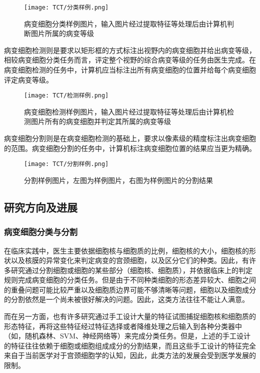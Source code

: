\begin{figure}[h]
    \centering
    \texttt{[image: TCT/分类样例.png]}
    \caption{病变细胞分类样例图片，输入图片经过提取特征等处理后由计算机判断图片所属的病变等级}
    \label{分类样例}
\end{figure}
\par 病变细胞检测则是要求以矩形框的方式标注出视野内的病变细胞并给出病变等级，相较病变细胞分类任务而言，评定整个视野的综合病变等级的任务由医生完成。在病变细胞检测的任务中，计算机应当标注出所有病变细胞的位置并给每个病变细胞评定病变等级。

\begin{figure}[h]
    \centering
    \texttt{[image: TCT/检测样例.png]}
    \caption{病变细胞检测样例图片，输入图片经过提取特征等处理后由计算机检测图片所有的病变细胞并判定其所属的病变等级}
    \label{检测样例}
\end{figure}
\par 病变细胞分割则是在病变细胞检测的基础上，要求以像素级的精度标注出病变细胞的范围。病变细胞分割的任务中，计算机标注病变细胞位置的结果应当更为精确。

\begin{figure}[h]
    \centering
    \texttt{[image: TCT/分割样例.png]}
    \caption{分割样例图片，左图为样例图片，右图为样例图片的分割结果}
    \label{分割样例}
\end{figure}

\subsection{研究方向及进展}

\subsubsection{病变细胞分类与分割}
\par 在临床实践中，医生主要依据细胞核与细胞质的比例，细胞核的大小，细胞核的形状以及核膜的异常变化来判定病变的宫颈细胞，以及区分它们的种类。因此，有许多研究\cite{zhang2014segmentation}\cite{zhang2017graph}\cite{lee2016segmentation}通过分割细胞或细胞的某些部分（细胞核、细胞质），并依据临床上的判定规则完成病变细胞的分类任务。但是由于不同种类细胞的形态差异较大、细胞之间的重叠问题可能比较严重以及细胞质边界可能不够清晰等问题，细胞以及细胞成分的分割依然是一个尚未被很好解决的问题。因此，这类方法往往不能让人满意。
\par 而在另一方面，也有许多研究\cite{marinakis2009pap}\cite{phoulady2016automatic}通过手工设计大量的特征试图捕捉细胞核和细胞质的形态特征，再将这些特征经过特征选择或者降维处理之后输入到各种分类器中（如，随机森林、SVM、神经网络等）来完成分类任务。但是，上述的手工设计的特征往往依赖于细胞或细胞组成成分的分割结果，而且这些手工设计的特征完全来自于当前医学对于宫颈细胞学的认知，因此，此类方法的发展会受到医学发展的限制。
